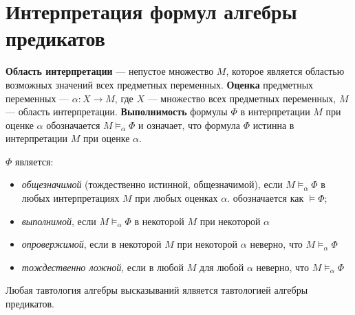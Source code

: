 \section{Интерпретация формул алгебры предикатов}
\dftion \textbf{Область интерпретации} --- непустое множество $M$, которое является областью возможных значений всех предметных переменных.
\dftion \textbf{Оценка} предметных переменных --- $\alpha: X \to M$, где $X$ --- множество всех предметных переменных, $M$ --- область интерпретации.
\dftion \textbf{Выполнимость} формулы $\Phi$ в интерпретации $M$ при оценке $\alpha$ обозначается $M \vDash_\alpha \Phi$ и означает, что формула $\Phi$ истинна в интерпретации $M$ при оценке $\alpha$.

\dftion  $\Phi$ является:
\begin{itemize}
    \item \textit{общезначимой} (тождественно истинной, общезначимой), если $M \vDash_\alpha \Phi$ в любых интерпретациях $M$ при любых оценках $\alpha$. обозначается как $\vDash \Phi$;
    \item \textit{выполнимой}, если $M \vDash_\alpha \Phi$ в некоторой $M$ при некоторой $\alpha$
    \item \textit{опровержимой}, если в некоторой $M$ при некоторой $\alpha$ неверно, что $M \vDash_\alpha \Phi$
    \item \textit{тождественно ложной}, если в любой $M$ для любой $\alpha$ неверно, что $M \vDash_\alpha \Phi$
\end{itemize}

Любая тавтология алгебры высказываний ялвяется тавтологией алгебры предикатов.